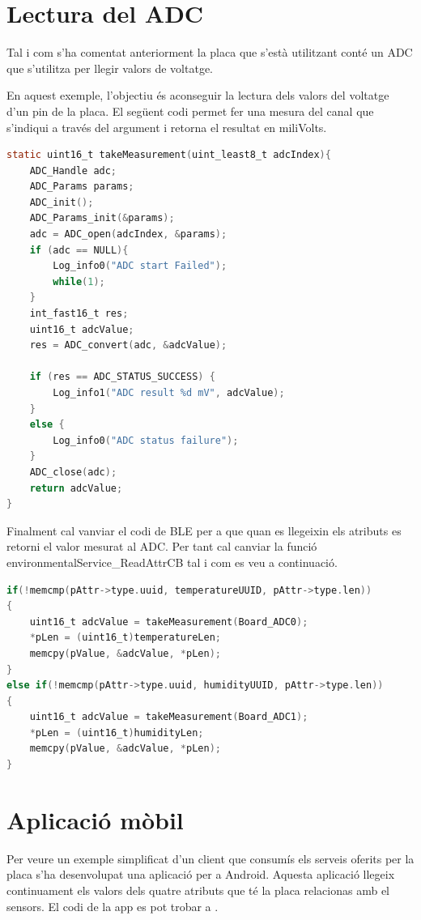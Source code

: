 \section{Lectura del ADC}
Tal i com s'ha comentat anteriorment la placa que s'està utilitzant conté un ADC que s'utilitza per llegir valors de voltatge.

En aquest exemple, l'objectiu és aconseguir la lectura dels valors del voltatge d'un pin de la placa.
El següent codi permet fer una mesura del canal que s'indiqui a través del argument i retorna el resultat en miliVolts.

\begin{lstlisting}[language=C]
static uint16_t takeMeasurement(uint_least8_t adcIndex){
	ADC_Handle adc;
	ADC_Params params;
	ADC_init();
	ADC_Params_init(&params);
	adc = ADC_open(adcIndex, &params);
	if (adc == NULL){
		Log_info0("ADC start Failed");
		while(1);
	}
	int_fast16_t res;
	uint16_t adcValue;
	res = ADC_convert(adc, &adcValue);
	
	if (res == ADC_STATUS_SUCCESS) {
		Log_info1("ADC result %d mV", adcValue);
	}
	else {
		Log_info0("ADC status failure");
	}
	ADC_close(adc);
	return adcValue;
}
\end{lstlisting}

Finalment cal vanviar el codi de BLE per a que quan es llegeixin els atributs es retorni el valor mesurat al ADC.
Per tant cal canviar la funció environmentalService\_ReadAttrCB tal i com es veu a continuació.

\begin{lstlisting}[language=C]
  if(!memcmp(pAttr->type.uuid, temperatureUUID, pAttr->type.len))
{
	uint16_t adcValue = takeMeasurement(Board_ADC0);
	*pLen = (uint16_t)temperatureLen;
	memcpy(pValue, &adcValue, *pLen);
}
else if(!memcmp(pAttr->type.uuid, humidityUUID, pAttr->type.len))
{
	uint16_t adcValue = takeMeasurement(Board_ADC1);
	*pLen = (uint16_t)humidityLen;
	memcpy(pValue, &adcValue, *pLen);
}
\end{lstlisting}

\section{Aplicació mòbil}
Per veure un exemple simplificat d'un client que consumís els serveis oferits per la placa s'ha desenvolupat una aplicació per a Android.
Aquesta aplicació llegeix continuament els valors dels quatre atributs que té la placa relacionas amb el sensors.
El codi de la app es pot trobar a \cite{android_repo}.

